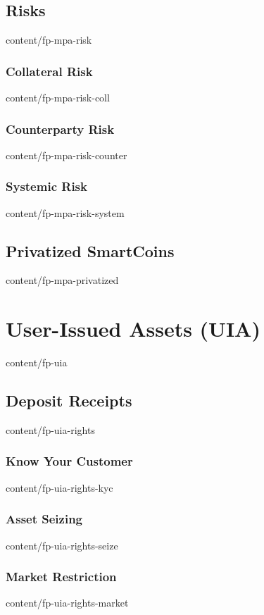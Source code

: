 \documentclass{btswhitepaper}
\begin{document}
\subsection     { Risks                                            }  { content/fp-mpa-risk            } 
\subsubsection  { Collateral Risk                                  }  { content/fp-mpa-risk-coll       } 
\subsubsection  { Counterparty Risk                                }  { content/fp-mpa-risk-counter    } 
\subsubsection  { Systemic Risk                                    }  { content/fp-mpa-risk-system     } 
\subsection     { Privatized SmartCoins                            }  { content/fp-mpa-privatized      } 

\section        { User-Issued Assets (UIA)                         }  { content/fp-uia                 } 
\subsection     { Deposit Receipts                                 }  { content/fp-uia-rights          } 
\subsubsection  { Know Your Customer                               }  { content/fp-uia-rights-kyc      } 
\subsubsection  { Asset Seizing                                    }  { content/fp-uia-rights-seize    } 
\subsubsection  { Market Restriction                               }  { content/fp-uia-rights-market   } 
\end{document}
